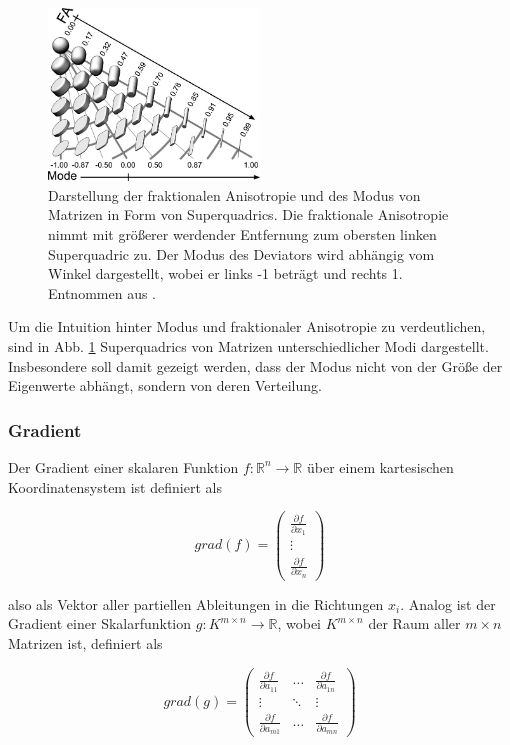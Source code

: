 \documentclass[a4paper,fontsize=12pt,toc=bib,halfparskip]{scrartcl}
\begin{document}
\begin{figure}
	\centering
	\includegraphics[width=0.5\textwidth]{pictures/001.png}
	\caption{Darstellung der fraktionalen Anisotropie und des Modus von Matrizen in Form von Superquadrics\cite{kindlmann2004superquadric}. Die fraktionale Anisotropie nimmt mit gr\"o{\ss}erer werdender Entfernung zum obersten linken Superquadric zu. Der Modus des Deviators wird abh\"angig vom Winkel dargestellt, wobei er links -1 betr\"agt und rechts 1. Entnommen aus \cite[S.~140]{ennis2006orthogonal}.}
	\label{Modus}
\end{figure}
Um die Intuition hinter Modus und fraktionaler Anisotropie zu verdeutlichen, sind in Abb. \ref{Modus} Superquadrics von Matrizen unterschiedlicher Modi dargestellt. Insbesondere soll damit gezeigt werden, dass der Modus nicht von der Gr\"o{\ss}e der Eigenwerte abh\"angt, sondern von deren Verteilung.

\subsubsection{Gradient}
Der Gradient einer skalaren Funktion $f: \mathbb{R}^n \rightarrow \mathbb{R}$  \"uber einem kartesischen Koordinatensystem ist definiert als

\begin{equation}
	grad(f) = 	
	\begin{pmatrix}
		\frac{\partial f}{\partial x_1} \\
		\vdots \\
		\frac{\partial f}{\partial x_n}
	\end{pmatrix}
\end{equation}

also als Vektor aller partiellen Ableitungen in die Richtungen $x_i$. Analog ist der Gradient einer Skalarfunktion $g: K^{m\times n} \rightarrow \mathbb{R}$, wobei $K^{m\times n}$ der Raum aller $m\times n$ Matrizen ist, definiert als

\begin{equation}
	grad(g) =
	\begin{pmatrix}
		\frac{\partial f}{\partial a_{11}} & \dots & \frac{\partial f}{\partial a_{1n}}  \\
		\vdots & \ddots & \vdots \\
		\frac{\partial f}{\partial a_{m1}} & \dots & \frac{\partial f}{\partial a_{mn}} 
	\end{pmatrix}
\end{equation}
\end{document}
